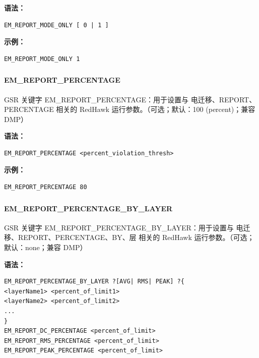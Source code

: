 \textbf{语法：}
\begin{lstlisting}
EM_REPORT_MODE_ONLY [ 0 | 1 ]
\end{lstlisting}

\textbf{示例：}
\begin{lstlisting}
EM_REPORT_MODE_ONLY 1
\end{lstlisting}

\subsubsection{}
\paragraph*{EM_REPORT_PERCENTAGE}

GSR 关键字 EM_REPORT_PERCENTAGE：用于设置与 电迁移、REPORT、PERCENTAGE 相关的 RedHawk 运行参数。（可选；默认：100 (percent)；兼容 DMP）

\textbf{语法：}
\begin{lstlisting}
EM_REPORT_PERCENTAGE <percent_violation_thresh>
\end{lstlisting}

\textbf{示例：}
\begin{lstlisting}
EM_REPORT_PERCENTAGE 80
\end{lstlisting}

\subsubsection{}
\paragraph*{EM_REPORT_PERCENTAGE_BY_LAYER}

GSR 关键字 EM_REPORT_PERCENTAGE_BY_LAYER：用于设置与 电迁移、REPORT、PERCENTAGE、BY、层 相关的 RedHawk 运行参数。（可选；默认：none；兼容 DMP）

\textbf{语法：}
\begin{lstlisting}
EM_REPORT_PERCENTAGE_BY_LAYER ?[AVG| RMS| PEAK] ?{
<layerName1> <percent_of_limit1>
<layerName2> <percent_of_limit2>
...
}
EM_REPORT_DC_PERCENTAGE <percent_of_limit>
EM_REPORT_RMS_PERCENTAGE <percent_of_limit>
EM_REPORT_PEAK_PERCENTAGE <percent_of_limit>
\end{lstlisting}

\subsubsection{}
